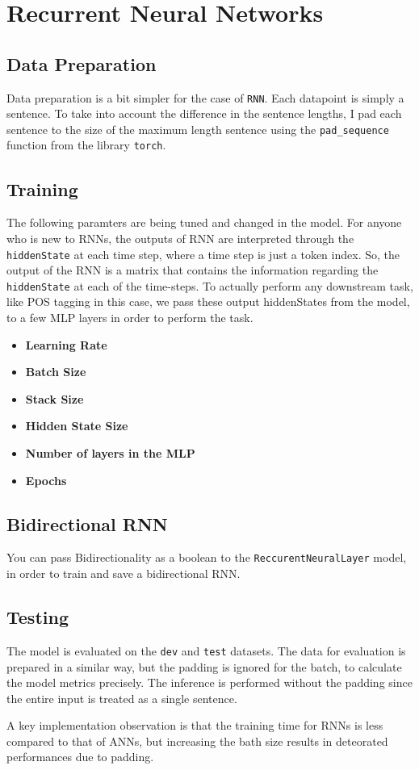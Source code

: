 \section*{Recurrent Neural Networks}

\subsection*{Data Preparation}
Data preparation is a bit simpler for the case of \verb|RNN|. Each datapoint is simply a sentence. To take into account the difference in the sentence lengths, I pad each sentence to the size of the maximum length sentence using the \verb|pad_sequence| function from the library \verb|torch|.

\subsection*{Training}
The following paramters are being tuned and changed in the model. For anyone who is new to RNNs, the outputs of RNN are interpreted through the \verb|hiddenState| at each time step, where a time step is just a token index. So, the output of the RNN is a matrix that contains the information regarding the \verb|hiddenState| at each of the time-steps. To actually perform any downstream task, like POS tagging in this case, we pass these output hiddenStates from the model, to a few MLP layers in order to perform the task.

\begin{itemize}
    \item \textbf{Learning Rate}
    \item \textbf{Batch Size}
    \item \textbf{Stack Size}
    \item \textbf{Hidden State Size}
    \item \textbf{Number of layers in the MLP}
    \item \textbf{Epochs}
\end{itemize}

\subsection*{Bidirectional RNN}
You can pass Bidirectionality as a boolean to the \verb|ReccurentNeuralLayer| model, in order to train and save a bidirectional RNN.

\subsection*{Testing}
The model is evaluated on the \verb|dev| and \verb|test| datasets. The data for evaluation is prepared in a similar way, but the padding is ignored for the batch, to calculate the model metrics precisely. The inference is performed without the padding since the entire input is treated as a single sentence.

A key implementation observation is that the training time for RNNs is less compared to that of ANNs, but increasing the bath size results in deteorated performances due to padding.
